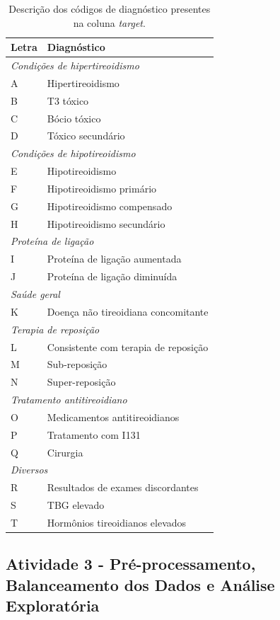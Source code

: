 \documentclass[11pt]{article}
\begin{document}
\begin{table}[H]
\centering
\caption{Descrição dos códigos de diagnóstico presentes na coluna \textit{target}.}
\label{tab:target}
\begin{tabular}{ll}
\toprule
\textbf{Letra} & \textbf{Diagnóstico} \\
\midrule
\multicolumn{2}{l}{\textit{Condições de hipertireoidismo}} \\
A & Hipertireoidismo \\
B & T3 tóxico \\
C & Bócio tóxico \\
D & Tóxico secundário \\
\midrule
\multicolumn{2}{l}{\textit{Condições de hipotireoidismo}} \\
E & Hipotireoidismo \\
F & Hipotireoidismo primário \\
G & Hipotireoidismo compensado \\
H & Hipotireoidismo secundário \\
\midrule
\multicolumn{2}{l}{\textit{Proteína de ligação}} \\
I & Proteína de ligação aumentada \\
J & Proteína de ligação diminuída \\
\midrule
\multicolumn{2}{l}{\textit{Saúde geral}} \\
K & Doença não tireoidiana concomitante \\
\midrule
\multicolumn{2}{l}{\textit{Terapia de reposição}} \\
L & Consistente com terapia de reposição \\
M & Sub-reposição \\
N & Super-reposição \\
\midrule
\multicolumn{2}{l}{\textit{Tratamento antitireoidiano}} \\
O & Medicamentos antitireoidianos \\
P & Tratamento com I131 \\
Q & Cirurgia \\
\midrule
\multicolumn{2}{l}{\textit{Diversos}} \\
R & Resultados de exames discordantes \\
S & TBG elevado \\
T & Hormônios tireoidianos elevados \\
\bottomrule
\end{tabular}
\end{table}

\subsection{Atividade 3 - Pré-processamento, Balanceamento dos Dados e Análise Exploratória}
\end{document}
